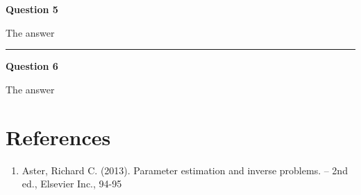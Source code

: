 \documentclass[
]{article}
\providecommand{\tightlist}{%
  \setlength{\itemsep}{0pt}\setlength{\parskip}{0pt}}
\begin{document}
\textbf{Question 5}

The answer

\begin{center}\rule{0.5\linewidth}{0.5pt}\end{center}

\textbf{Question 6}

The answer

\newpage

\hypertarget{references}{%
\section{References}\label{references}}

\begin{enumerate}
\def\labelenumi{\arabic{enumi})}
\tightlist
\item
  Aster, Richard C. (2013). Parameter estimation and inverse problems.
  -- 2nd ed., Elsevier Inc., 94-95
\end{enumerate}
\end{document}
